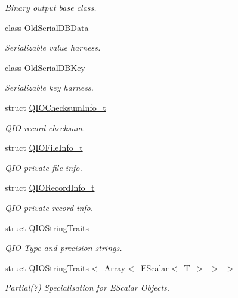 \begin{DoxyCompactItemize}
\begin{DoxyCompactList}\small\item\em Binary output base class. \end{DoxyCompactList}\item 
class \mbox{\hyperlink{classADATIO_1_1OldSerialDBData}{Old\+Serial\+D\+B\+Data}}
\begin{DoxyCompactList}\small\item\em Serializable value harness. \end{DoxyCompactList}\item 
class \mbox{\hyperlink{classADATIO_1_1OldSerialDBKey}{Old\+Serial\+D\+B\+Key}}
\begin{DoxyCompactList}\small\item\em Serializable key harness. \end{DoxyCompactList}\item 
struct \mbox{\hyperlink{structADATIO_1_1QIOChecksumInfo__t}{Q\+I\+O\+Checksum\+Info\+\_\+t}}
\begin{DoxyCompactList}\small\item\em Q\+IO record checksum. \end{DoxyCompactList}\item 
struct \mbox{\hyperlink{structADATIO_1_1QIOFileInfo__t}{Q\+I\+O\+File\+Info\+\_\+t}}
\begin{DoxyCompactList}\small\item\em Q\+IO private file info. \end{DoxyCompactList}\item 
struct \mbox{\hyperlink{structADATIO_1_1QIORecordInfo__t}{Q\+I\+O\+Record\+Info\+\_\+t}}
\begin{DoxyCompactList}\small\item\em Q\+IO private record info. \end{DoxyCompactList}\item 
struct \mbox{\hyperlink{structADATIO_1_1QIOStringTraits}{Q\+I\+O\+String\+Traits}}
\begin{DoxyCompactList}\small\item\em Q\+IO Type and precision strings. \end{DoxyCompactList}\item 
struct \mbox{\hyperlink{structADATIO_1_1QIOStringTraits_3_01Array_3_01EScalar_3_01T_01_4_01_4_01_4}{Q\+I\+O\+String\+Traits$<$ Array$<$ E\+Scalar$<$ T $>$ $>$ $>$}}
\begin{DoxyCompactList}\small\item\em Partial(?) Specialisation for E\+Scalar Objects. \end{DoxyCompactList}\item 

\end{DoxyCompactItemize}
